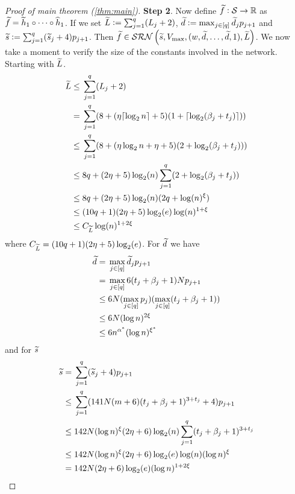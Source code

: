 \begin{proof}[Proof of main theorem (\ref{thm:main})]
  \textbf{Step 2}.
  Now define $\widetilde{f}:\mathcal{S} \to \mathbb{R}$
  as $\widetilde{f} = \widetilde{h}_1 \circ \dots \circ \widehat{h}_1$.
  If we set
  $\widetilde{L} \vcentcolon= \sum_{j=1}^q (L_j + 2)$,
  $\widetilde{d} \vcentcolon= \max_{j \in [q]} \widetilde{d}_j p_{j+1}$
  and $\widetilde{s} \vcentcolon= \sum_{j=1}^q (\widetilde{s}_j + 4) p_{j+1}$.
  Then $\widetilde{f} \in \mathcal{SRN} \left( \widetilde{s}, V_{\max},
  (w, \widetilde{d}, \dots, \widetilde{d}, 1), {\widetilde{L}} \right)$.
  We now take a moment to verify the size 
  of the constants involved in the network.
  Starting with $\widetilde{L}$.
  \begin{align*}
    \widetilde{L} \leq & \; \sum_{j=1}^q (L_j + 2)
    \\ = & \; \sum_{j=1}^q (8 + (\eta \lceil\log_2 n\rceil + 5)
    (1 + \lceil\log_2(\beta_j + t_j)\rceil))
    \\ \leq & \; \sum_{j=1}^q (8 + (\eta \log_2 n + \eta + 5)
    (2 + \log_2(\beta_j + t_j)))
    \\ \leq & \; 8q + (2 \eta + 5) \log_2(n)
    \sum_{j=1}^q (2 + \log_2(\beta_j + t_j)) 
    \\ \leq & \; 8q + (2 \eta + 5) \log_2(n)
    (2q + \log(n)^\xi) 
    \\ \leq & \; (10q + 1) (2 \eta + 5) \log_2(e) \log(n)^{1 + \xi}
    \\ \leq & \; C_{\widetilde{L}} \log(n)^{1 + 2\xi}
  \end{align*}
  where $C_{\widetilde{L}} = (10q + 1)(2\eta + 5)\log_2(e)$.
  For $\widetilde{d}$ we have
  \begin{align*}
    \widetilde{d} = & \; \max_{j \in [q]} \widetilde{d}_j p_{j+1}
    \\ = & \; \max_{j \in [q]} 6(t_j + \beta_j + 1) N p_{j+1}
    \\ \leq & \; 6 N (\max_{j \in [q]} p_j)
    (\max_{j \in [q]} (t_j + \beta_j + 1))
    \\ \leq & \; 6 N (\log n)^{2 \xi}
    \\ \leq & \; 6 n^{\alpha^*} (\log n)^{\xi^*}
  \end{align*}
  and for $\widetilde{s}$
  \begin{align*}
    \wt{s} = & \; \sum_{j=1}^q (\wt{s}_j + 4) p_{j+1}
    \\ \leq & \; \sum_{j=1}^q (141 N (m + 6)
    (t_j + \beta_j + 1)^{3 + t_j} + 4) p_{j+1}
    \\ \leq & \; 142 N (\log n)^\xi (2 \eta + 6) \log_2(n)
    \sum_{j=1}^q (t_j + \beta_j + 1)^{3 + t_j}
    \\ \leq & \; 142 N (\log n)^\xi (2 \eta + 6) \log_2(e) \log(n)
    (\log n)^\xi
    \\ = & \; 142 N (2 \eta + 6) \log_2(e) (\log n)^{1+ 2\xi}

\end{align*}
\end{proof}
